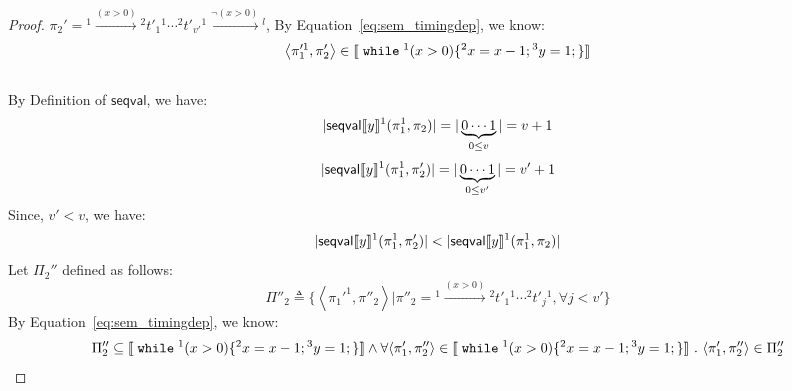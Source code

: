 \begin{example}
\begin{proof}
%
$\pi_2' = {}^1 \xrightarrow{(x > 0)} {}^2 t'_1 {}^1 \cdots  {}^2 t'_{v'} {}^1 \xrightarrow{\neg(x > 0)} {}^l $,
%
 By Equation~\ref{eq:sem_timingdep}, we know:
\[
	\left< \pi_1'^1, \pi'_2 \right> \in \sem{\ewhile {}^1 (x > 0) \{{}^2 x = x - 1; {}^3 y = 1;\} }
\]
%
\\
By Definition of $\mathsf{seqval}$, we have:
\[
	|\mathsf{seqval}\llbracket y \rrbracket{}^1(\pi_1^1, \pi_2 )| = |\underbrace{0 \cdots 1}_{0 \leq v}| = v + 1
\]
%
\[
	|\mathsf{seqval}\llbracket y \rrbracket{}^1(\pi_1^1, \pi_2' )| = |\underbrace{0 \cdots 1}_{0 \leq v'}| = v' + 1
\]
%
Since, $v' < v $, we have: 
\[
	|\mathsf{seqval}\llbracket y \rrbracket{}^1(\pi_1^1, \pi_2' )| < |\mathsf{seqval}\llbracket y \rrbracket{}^1(\pi_1^1, \pi_2 )|
\]
%
Let $\Pi_2''$ defined as follows:
\[
	\Pi''_2 \triangleq \{
	\left< \pi_1'^1, \pi''_2 \right> \vert
	\pi''_2 =  {}^1 \xrightarrow{(x > 0)} {}^2 t'_1 {}^1 \cdots  {}^2 t'_{j} {}^1, \forall j < v'\} 
\]
%
By Equation~\ref{eq:sem_timingdep}, we know:
%
\[
		\Pi''_2 \subseteq \sem{\ewhile {}^1 (x > 0) \{{}^2 x = x - 1; {}^3 y = 1;\} }
		\land
		\forall \left< \pi_1', \pi''_2 \right> \in \sem{\ewhile {}^1 (x > 0) \{{}^2 x = x - 1; {}^3 y = 1;\} } 
		\st \left< \pi_1', \pi''_2 \right> \in  \Pi''_2
\]
%


\end{proof}
\end{example}
